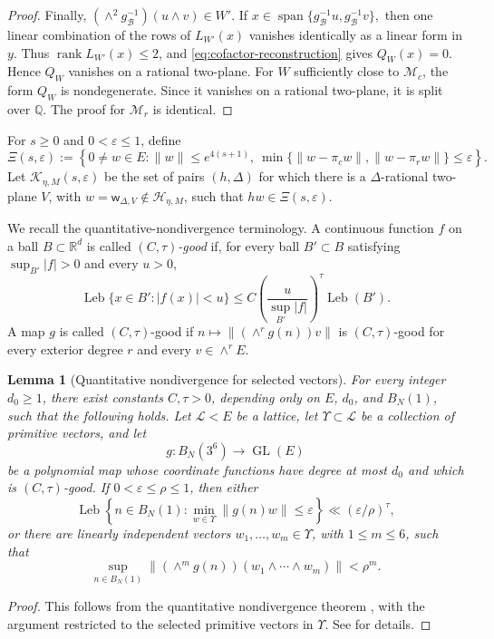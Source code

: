 \documentclass[reqno,11pt]{amsart}
\newtheorem{lem}[lem]{Lemma}
\theoremstyle{definition}
\theoremstyle{remark}
\numberwithin{equation}{section}
\newcommand{\GL}{\operatorname{GL}}
\newcommand{\Leb}{\operatorname{Leb}}
\begin{document}
\begin{proof}
Finally,
$(\wedge^2g_{\mathcal B}^{-1})(u\wedge v)\in W'$. If
$
x\in
\operatorname{span}
\{g_{\mathcal B}^{-1}u,g_{\mathcal B}^{-1}v\},
$
then one linear combination of the rows of $L_{W'}(x)$ vanishes
identically as a linear form in $y$. Thus
$\operatorname{rank}L_{W'}(x)\le2$, and
\eqref{eq:cofactor-reconstruction} gives $Q_W(x)=0$. Hence $Q_W$
vanishes on a rational two-plane. For $W$ sufficiently close to $\mathcal M_c$, the form $Q_W$ is
nondegenerate. Since it vanishes on a rational two-plane, it is split over
$\mathbb Q$. The proof for $\mathcal M_r$ is identical.
\end{proof}

For $s\ge0$ and $0<\varepsilon\le1$, define
$$
\Xi(s,\varepsilon)
:=
\left\{
0\ne w\in E:
\|w\|\le e^{4(s+1)},\
\min\{\|w-\pi_cw\|,\|w-\pi_rw\|\}\le\varepsilon
\right\}.
$$
Let $\mathcal K_{\eta,M}(s,\varepsilon)$ be the set of pairs $(h,\Delta)$ for which there is a $\Delta$-rational two-plane $V$, with $w=\mathsf w_{\Delta,V}\notin\mathcal H_{\eta,M}$, such that $hw\in\Xi(s,\varepsilon)$.


We recall the quantitative-nondivergence terminology. A continuous
function $f$ on a ball $B\subset\mathbb R^d$ is called
\emph{$(C,\tau)$-good} if, for every ball $B'\subset B$ satisfying
$\sup_{B'}|f|>0$ and every $u>0$,
$$
\Leb\{x\in B':|f(x)|<u\}
\le
C
\left(
\frac{u}{\sup_{B'}|f|}
\right)^\tau
\Leb(B').
$$
A map $g$ is called $(C,\tau)$-good if
$n\mapsto\|(\wedge^rg(n))v\|$ is $(C,\tau)$-good for every exterior
degree $r$ and every $v\in\wedge^rE$.

\begin{lem}[Quantitative nondivergence for selected vectors]
\label{lem:d2-prescribed-qnd}
For every integer $d_0\ge1$, there exist constants $C,\tau>0$, depending
only on $E$, $d_0$, and $B_N(1)$, such that the following holds. Let
$\mathcal L<E$ be a lattice, let $\Upsilon\subset\mathcal L$ be a
collection of primitive vectors, and let
$$
g:B_N(3^6)\to \GL(E)
$$
be a polynomial map whose coordinate functions have degree at most $d_0$
and which is $(C,\tau)$-good. If
$0<\varepsilon\le\rho\le1$, then either
$$
\Leb\left\{
n\in B_N(1):
\min_{w\in\Upsilon}\|g(n)w\|\le\varepsilon
\right\}
\ll
(\varepsilon/\rho)^\tau,
$$
or there are linearly independent vectors
$w_1,\ldots,w_m\in\Upsilon$, with $1\le m\le6$, such that
$$
\sup_{n\in B_N(1)}
\|(\wedge^mg(n))(w_1\wedge\cdots\wedge w_m)\|
<
\rho^m.
$$
\end{lem}

\begin{proof}
This follows from the quantitative nondivergence theorem
\cite[Theorem~2.1]{kleinbock:2008}, with the argument restricted to the
selected primitive vectors in $\Upsilon$. See
\cite[Proposition~7.3]{KimOh_det} for details.
\end{proof}
\end{document}
